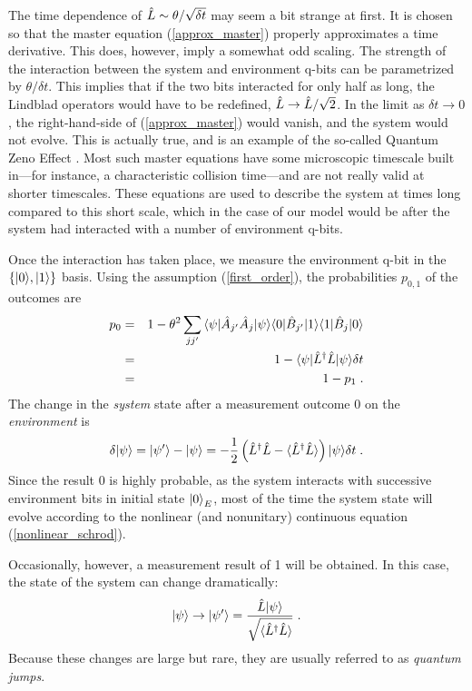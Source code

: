 The time dependence of ${\hat L} \sim \theta/\sqrt{\delta t}$ may seem a bit
strange at first.  It is chosen so that the master equation
(\ref{approx_master}) properly approximates a time derivative.
This does, however, imply a somewhat odd scaling.  The strength of
the interaction between the system and environment q-bits can be
parametrized by $\theta/\delta t$.  This implies that if the two bits
interacted for only half as long, the Lindblad operators would have
to be redefined, ${\hat L} \rightarrow {\hat L}/\sqrt{2}$.  In the limit as
$\delta t \rightarrow 0$, the right-hand-side of (\ref{approx_master})
would vanish, and the system would not evolve.  This is actually
true, and is an example of the so-called Quantum Zeno Effect \cite{Misra}.
Most such master equations have some microscopic timescale built
in---for instance, a characteristic collision time---and are not
really valid at shorter timescales.  These equations are used to
describe the system at times long compared to this short scale, which
in the case of our model would be after the system had interacted with
a number of environment q-bits.

Once the interaction has taken place,
we measure the environment q-bit in the $\{{| 0 \rangle},{| 1 \rangle}\}$ basis.
Using the assumption (\ref{first_order}),
the probabilities $p_{0,1}$ of the outcomes are
\begin{eqnarray}
p_0 &=& 1 - \theta^2 \sum_{jj'} {\langle \psi |}{\hat A}_{j'}{\hat A}_j{| \psi \rangle}
  {\langle 0 |}{\hat B}_{j'}{| 1 \rangle}{\langle 1 |}{\hat B}_j{| 0 \rangle} \nonumber\\
&=& 1 - {\langle \psi |} {\hat L^\dagger}{\hat L} {| \psi \rangle} \delta t \nonumber\\
&=& 1 - p_1 \;.
\end{eqnarray}
The change in the {\it system} state after a measurement outcome 0
on the {\it environment} is
\begin{equation}
\delta{| \psi \rangle} = {| \psi' \rangle} - {| \psi \rangle} = - {1\over2}
  \left( {\hat L^\dagger}{\hat L} - {\langle {\hat L^\dagger}{\hat L} \rangle} \right) {| \psi \rangle} \delta t \;.
\label{nonlinear_schrod}
\end{equation}
Since the result 0 is highly probable, as the system interacts with
successive environment bits in initial state ${| 0 \rangle}_E$,
most of the time the system
state will evolve according to the nonlinear (and nonunitary) continuous
equation (\ref{nonlinear_schrod}).

Occasionally, however, a measurement result of 1 will be obtained.
In this case, the state of the system can change dramatically:
\begin{equation}
{| \psi \rangle} \rightarrow {| \psi' \rangle} =
  { {\hat L}{| \psi \rangle} \over \sqrt{{\langle {\hat L^\dagger}{\hat L} \rangle}}} \;.
\label{theJump}
\end{equation}
Because these changes are large but rare, they are usually referred to
as {\it quantum jumps}.

